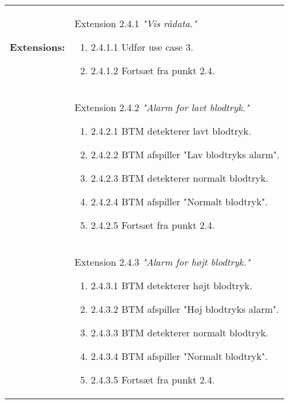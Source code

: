 \begin{table}[H]
\begin{tabular}{|p{5.5cm}|p{10cm}|}
\hline
\textbf{Extensions:} & Extension 2.4.1 \textit{"Vis rådata."}
\begin{enumerate}
\setlength\itemsep{0.1em}
\item[\labelname]2.4.1.1   Udfør use case 3.
\item[\labelname]2.4.1.2   Fortsæt fra punkt 2.4. 
\end{enumerate}
\\
& Extension 2.4.2 \textit{"Alarm for lavt blodtryk."}
\begin{enumerate}
\setlength\itemsep{0.1em}
\item[\labelname]2.4.2.1   BTM detekterer lavt blodtryk.
\item[\labelname]2.4.2.2   BTM afspiller "Lav blodtryks alarm".
\item[\labelname]2.4.2.3   BTM detekterer normalt blodtryk.
\item[\labelname]2.4.2.4   BTM afspiller "Normalt blodtryk". 
\item[\labelname]2.4.2.5   Fortsæt fra punkt 2.4. 
\end{enumerate}
\\
& Extension 2.4.3 \textit{"Alarm for højt blodtryk."}
\begin{enumerate}
\setlength\itemsep{0.1em}
\item[\labelname]2.4.3.1   BTM detekterer højt blodtryk.
\item[\labelname]2.4.3.2   BTM afspiller "Høj blodtryks alarm".
\item[\labelname]2.4.3.3   BTM detekterer normalt blodtryk.
\item[\labelname]2.4.3.4   BTM afspiller "Normalt blodtryk". 
\item[\labelname]2.4.3.5   Fortsæt fra punkt 2.4. 
\end{enumerate}

\\\hline
\end{tabular}
\end{table}

